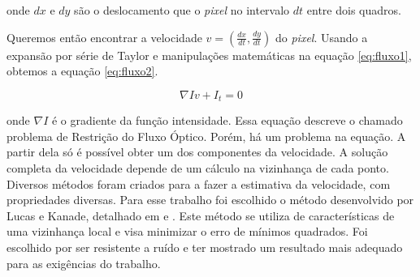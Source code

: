 onde $dx$ e $dy$ são o deslocamento que o \textit{pixel} no intervalo $dt$ entre dois quadros.

Queremos então encontrar a velocidade $v =(\frac{dx}{dt},\frac{dy}{dt})$ do \textit{pixel}. Usando a expansão por série de Taylor e manipulações matemáticas na equação \ref{eq:fluxo1}, obtemos a equação \ref{eq:fluxo2}\cite{faria1992fluxo}.

\begin{equation}
	\nabla Iv + I_t = 0
\label{eq:fluxo2}
\end{equation}

onde $\nabla I$ é o gradiente da função intensidade. Essa equação descreve o chamado problema de Restrição do Fluxo Óptico\cite{mota2011tensor}. Porém, há um problema na equação. A partir dela só é possível obter um dos componentes da velocidade. A solução completa da velocidade depende de um cálculo na vizinhança de cada ponto. Diversos métodos foram criados para a fazer a estimativa da velocidade, com propriedades diversas. Para esse trabalho foi escolhido o método desenvolvido por Lucas e Kanade, detalhado em \cite{faria1992fluxo}\cite{mota2011tensor} e \cite{bruhn2005lucas}. Este método se utiliza de características de uma vizinhança local e visa minimizar o erro de mínimos quadrados. Foi escolhido por ser resistente a ruído e ter mostrado um resultado mais adequado para as exigências do trabalho.









